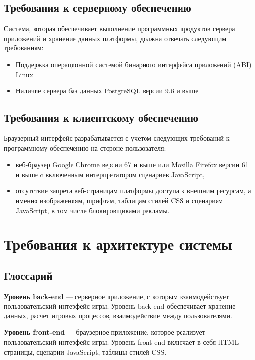 \documentclass[12pt, a4paper]{article}
\begin{document}
\subsection{Требования к серверному обеспечению}

Система, которая обеспечивает выполнение программных продуктов сервера приложений
и хранение данных платформы, должна отвечать следующим требованиям:

\begin{itemize}
\item Поддержка операционной системой бинарного интерфейса приложений (ABI) Linux
\item Наличие сервера баз данных PostgreSQL версии 9.6 и выше
\end{itemize}

\subsection{Требования к клиентскому обеспечению}

Браузерный интерфейс разрабатывается с учетом следующих требований к
программному обеспечению на стороне пользователя:

\begin{itemize}
\item веб-браузер Google Chrome версии 67 и выше или
Mozilla Firefox версии 61 и выше c включенным интерпретатором сценариев JavaScript,
\item отсутствие запрета веб-страницам платформы доступа к внешним ресурсам,
а именно изображениям, шрифтам, таблицам стилей CSS и сценариям JavaScript,
в том числе блокировщиками рекламы.
\end{itemize}

\section{Требования к архитектуре системы}

\subsection{Глоссарий}

\textbf{Уровень back-end} — серверное приложение, с которым взаимодействует
пользовательский интерфейс игры. Уровень back-end обеспечивает хранение данных,
расчет игровых процессов, взаимодействие между пользователями.

\textbf{Уровень front-end} — браузерное приложение, которое реализует
пользовательский интерфейс игры. Уровень front-end включает в себя
HTML-страницы, сценарии JavaScript, таблицы стилей CSS.
\end{document}
